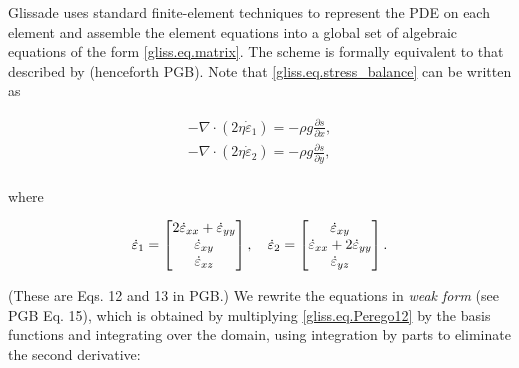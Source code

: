 Glissade uses standard finite-element techniques to represent the PDE on each element and assemble
the element equations into a global set of algebraic equations of the form \eqref{gliss.eq.matrix}.
The scheme is formally equivalent to that described by \citet{Perego2012} (henceforth PGB).
Note that \eqref{gliss.eq.stress_balance} can be written as

\begin{equation}
  \label{gliss.eq.Perego12}
  \begin{split}
    -\nabla \cdot (2\eta {{{\dot{\varepsilon }}}_{1}}) = -\rho g\frac{\partial s}{\partial x}, \\
    -\nabla \cdot (2\eta {{{\dot{\varepsilon }}}_{2}}) = -\rho g\frac{\partial s}{\partial y}, \\
  \end{split}
\end{equation}

\noindent
where

\begin{equation}
  \label{gliss.eq.Perego13}
  {{{\dot{\varepsilon }}}_{1}}=\left[ \begin{matrix}
      2{{{\dot{\varepsilon }}}_{xx}}+{{{\dot{\varepsilon }}}_{yy}} \\ 
      {{{\dot{\varepsilon }}}_{xy}} \\ 
      {{{\dot{\varepsilon }}}_{xz}} \\ 
    \end{matrix} \right], \quad
  {{{\dot{\varepsilon }}}_{2}}=\left[ \begin{matrix}
      {{{\dot{\varepsilon }}}_{xy}} \\ 
      {{{\dot{\varepsilon }}}_{xx}}+2{{{\dot{\varepsilon }}}_{yy}} \\ 
      {{{\dot{\varepsilon }}}_{yz}} \\ 
    \end{matrix} \right].  \\
\end{equation}

\noindent
(These are Eqs. 12 and 13 in PGB.)  We rewrite the equations in \textit{weak form} (see PGB Eq. 15), which
is obtained by multiplying \eqref{gliss.eq.Perego12} by the basis functions and integrating over the domain, using 
integration by parts to eliminate the second derivative:

